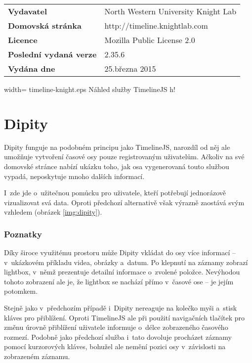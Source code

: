 		\vspace{\baselineskip}
		\renewcommand{\arraystretch}{1.3}
		\noindent
		\begin{tabularx}{\textwidth}{|lX|}
		\hline
		\bf Vydavatel & North Western University Knight Lab \\
		\bf Domovská stránka & http://timeline.knightlab.com \\
		\bf Licence & Mozilla Public License 2.0 \\
		\bf Poslední vydaná verze & 2.35.6 \\
		\bf Vydána dne & 25.\ts března 2015 \\
		\hline
		\end{tabularx}
		
		  {width=\textwidth}
		  {timeline-knight.eps}
		  {Náhled služby {\sf TimelineJS}}
		  {h!}
		
	\section{\sf Dipity}
	\label{analyza-dipity}
		{\sf Dipity} funguje na podobném principu jako {\sf TimelineJS}, narozdíl od něj ale umož\-ňuje vytvoření časové osy pouze registrovaným uživatelům. Ačkoliv na své domovské stránce nabízí ukázku toho, jak osa vygenerovaná touto službou vypadá, neposkytuje mnoho dalších informací. 
		
		I~zde jde o~užitečnou pomůcku pro uživatele, kteří potřebují jednorázově vizualizovat svá data. Oproti předchozí alternativě však výrazně zaostává svým vzhledem (obrázek \ref{img:dipity}).
		
		\subsubsection*{Poznatky} 
		Díky široce využitému prostoru může {\sf Dipity} vkládat do osy více informací -- v~ukázkovém příkladu videa, obrázky a~datum. Po klepnutí na záznamy zobrazí lightbox, v~němž prezentuje detailní informace o~zvolené položce. Nevýhodou tohoto zobrazení ale je, že lightbox se nachází přímo v~časové ose -- je jejím potomkem.
		
		Stejně jako v~předchozím případě i~{\sf Dipity} nereaguje na kolečko myši a~stisk kláves pro přiblížení. Oproti {\sf TimelineJS} ale při použití navigačních tlačítek pro změnu úrovně přiblížení uživatele informuje o~délce zobrazeného časového rozmezí. Podobně jako předchozí služba i~tato dovoluje procházet záznamy pomocí kurzorových kláves, bohužel ale nemění pozici osy v~závislosti na zobrazeném záznamu.
		
